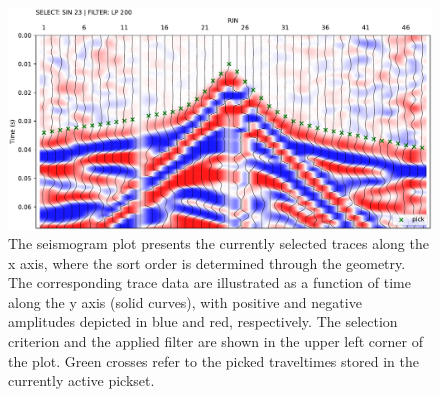 \documentclass[a4paper,fleqn]{cas-sc}
\providecommand{\DIFdelbegin}{} %
\providecommand{\DIFaddbeginFL}{} %
\providecommand{\DIFaddendFL}{} %
\providecommand{\DIFdelbeginFL}{} %
\providecommand{\DIFdelendFL}{} %
\newcommand{\DIFscaledelfig}{0.5}
\newlength{\DIFdelgraphicswidth} %
\newlength{\DIFdelgraphicsheight} %
\newcommand{\DIFaddincludegraphics}[2][]{{\color{blue}\fbox{\DIFOincludegraphics[#1]{#2}}}} %
\newcommand{\DIFdelincludegraphics}[2][]{%
\sbox{\DIFdelgraphicsbox}{\DIFOincludegraphics[#1]{#2}}%
\settoboxwidth{\DIFdelgraphicswidth}{\DIFdelgraphicsbox} %
\settoboxtotalheight{\DIFdelgraphicsheight}{\DIFdelgraphicsbox} %
\scalebox{\DIFscaledelfig}{%
\parbox[b]{\DIFdelgraphicswidth}{\usebox{\DIFdelgraphicsbox}\\[-\baselineskip] \rule{\DIFdelgraphicswidth}{0em}}\llap{\resizebox{\DIFdelgraphicswidth}{\DIFdelgraphicsheight}{%
\setlength{\unitlength}{\DIFdelgraphicswidth}%
\begin{picture}(1,1)%
\thicklines\linethickness{2pt} %
{\color[rgb]{1,0,0}\put(0,0){\framebox(1,1){}}}%
{\color[rgb]{1,0,0}\put(0,0){\line( 1,1){1}}}%
{\color[rgb]{1,0,0}\put(0,1){\line(1,-1){1}}}%
\end{picture}%
}\hspace*{3pt}}} %
} %
\DeclareRobustCommand{\DIFdelbegin}{\DIFOdelbegin \let\includegraphics\DIFdelincludegraphics} %
\DeclareRobustCommand{\DIFaddbeginFL}{\DIFOaddbeginFL \let\includegraphics\DIFaddincludegraphics} %
\DeclareRobustCommand{\DIFaddendFL}{\DIFOaddendFL \let\includegraphics\DIFOincludegraphics} %
\DeclareRobustCommand{\DIFdelbeginFL}{\DIFOdelbeginFL \let\includegraphics\DIFdelincludegraphics} %
\DeclareRobustCommand{\DIFdelendFL}{\DIFOaddendFL \let\includegraphics\DIFOincludegraphics} %
\begin{document}
\begin{figure}
	\centering
	\DIFdelbeginFL %
\DIFdelendFL \DIFaddbeginFL \includegraphics[width=.75\textwidth]{figures/srm_intro.pdf}
	\DIFaddendFL \caption{The seismogram plot presents the currently selected traces along the x axis, where the sort order is determined through the geometry. The corresponding trace data are illustrated as a function of time along the y axis (solid curves), with positive and negative amplitudes depicted in blue and red, respectively. The selection criterion and the applied filter are shown in the upper left corner of the plot. Green crosses refer to the picked traveltimes stored in the currently active pickset.}
	\label{fig:srm_intro}

\end{figure}
\DIFdelbegin %
\end{document}
